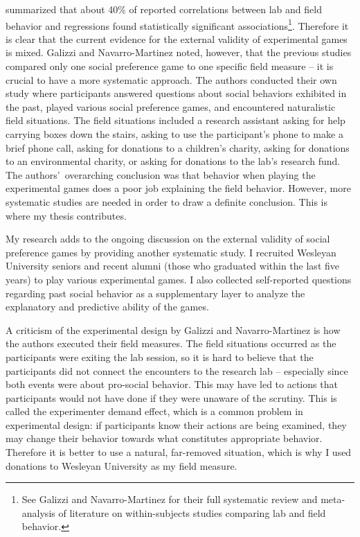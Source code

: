 \documentclass[12pt]{article}
\begin{document}
\cite{galizzi_navarro-martinez_2017} summarized that about 40\% of reported correlations between lab and field behavior and regressions found statistically significant associations\footnote{See Galizzi and Navarro-Martinez for their full systematic review and meta-analysis of literature on within-subjects studies comparing lab and field behavior.}. Therefore it is clear that the current evidence for the external validity of experimental games is mixed. Galizzi and Navarro-Martinez noted, however, that the previous studies compared only one social preference game to one specific field measure -- it is crucial to have a more systematic approach. The authors conducted their own study where participants answered questions about social behaviors exhibited in the past, played various social preference games, and encountered naturalistic field situations. The field situations included a research assistant asking for help carrying boxes down the stairs, asking to use the participant\rq s phone to make a brief phone call, asking for donations to a children\rq s charity, asking for donations to an environmental charity, or asking for donations to the lab\rq s research fund.  The authors\rq \ overarching conclusion was that behavior when playing the experimental games does a poor job explaining the field behavior. However, more systematic studies are needed in order to draw a definite conclusion. This is where my thesis contributes.

My research adds to the ongoing discussion on the external validity of social preference games by providing another systematic study. I recruited Wesleyan University seniors and recent alumni (those who graduated within the last five years) to play various experimental games. I also collected self-reported questions regarding past social behavior as a supplementary layer to analyze the explanatory and predictive ability of the games.

A criticism of the experimental design by Galizzi and Navarro-Martinez is how the authors executed their field measures. The field situations occurred as the participants were exiting the lab session, so it is hard to believe that the participants did not connect the encounters to the research lab -- especially since both events were about pro-social behavior. This may have led to actions that participants would not have done if they were unaware of the scrutiny. This is called the experimenter demand effect, which is a common problem in experimental design: if participants know their actions are being examined, they may change their behavior towards what constitutes appropriate behavior. Therefore it is better to use a natural, far-removed situation, which is why I used donations to Wesleyan University as my field measure.
\end{document}
